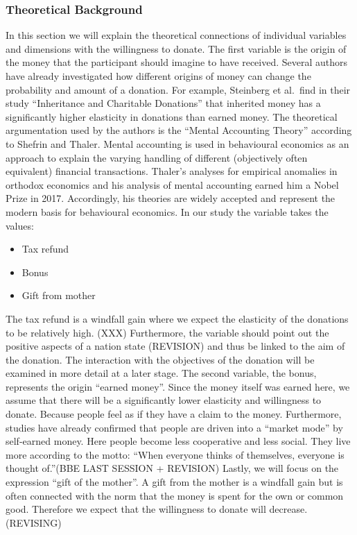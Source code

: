 \documentclass[
  12pt,
]{article}
\providecommand{\tightlist}{%
  \setlength{\itemsep}{0pt}\setlength{\parskip}{0pt}}
\begin{document}
\hypertarget{theoretical-background}{%
\subsubsection{Theoretical Background}\label{theoretical-background}}

In this section we will explain the theoretical connections of
individual variables and dimensions with the willingness to donate. The
first variable is the origin of the money that the participant should
imagine to have received. Several authors have already investigated how
different origins of money can change the probability and amount of a
donation. For example, Steinberg et al.~find in their study
``Inheritance and Charitable Donations'' that inherited money has a
significantly higher elasticity in donations than earned money. The
theoretical argumentation used by the authors is the ``Mental Accounting
Theory'' according to Shefrin and Thaler. Mental accounting is used in
behavioural economics as an approach to explain the varying handling of
different (objectively often equivalent) financial transactions.
Thaler's analyses for empirical anomalies in orthodox economics and his
analysis of mental accounting earned him a Nobel Prize in 2017.
Accordingly, his theories are widely accepted and represent the modern
basis for behavioural economics. In our study the variable takes the
values:

\begin{itemize}
\tightlist
\item
  Tax refund
\item
  Bonus
\item
  Gift from mother
\end{itemize}

The tax refund is a windfall gain where we expect the elasticity of the
donations to be relatively high. (XXX) Furthermore, the variable should
point out the positive aspects of a nation state (REVISION) and thus be
linked to the aim of the donation. The interaction with the objectives
of the donation will be examined in more detail at a later stage. The
second variable, the bonus, represents the origin ``earned money''.
Since the money itself was earned here, we assume that there will be a
significantly lower elasticity and willingness to donate. Because people
feel as if they have a claim to the money. Furthermore, studies have
already confirmed that people are driven into a ``market mode'' by
self-earned money. Here people become less cooperative and less social.
They live more according to the motto: ``When everyone thinks of
themselves, everyone is thought of.''(BBE LAST SESSION + REVISION)
Lastly, we will focus on the expression ``gift of the mother''. A gift
from the mother is a windfall gain but is often connected with the norm
that the money is spent for the own or common good. Therefore we expect
that the willingness to donate will decrease. (REVISING)
\end{document}
